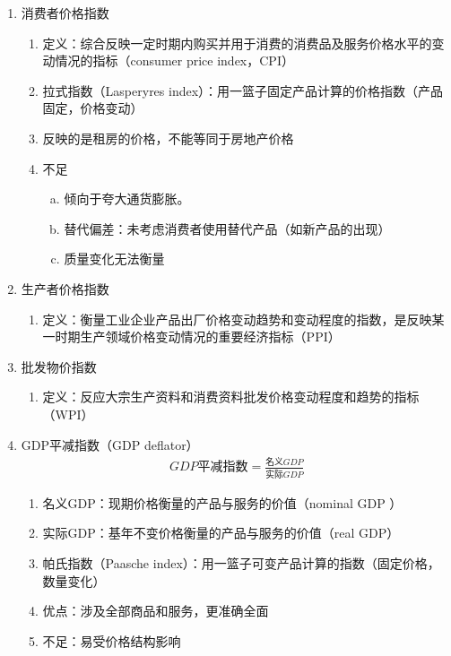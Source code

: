 \documentclass[12pt]{book}
\begin{document}
\begin{enumerate}[1.]
  \item 消费者价格指数
        \begin{enumerate}[(1)]
          \item 定义：综合反映一定时期内购买并用于消费的消费品及服务价格水平的变动情况的指标（consumer price index，CPI）
          \item 拉式指数（Lasperyres index）：用一篮子固定产品计算的价格指数（产品固定，价格变动）
          \item 反映的是租房的价格，不能等同于房地产价格
          \item 不足
                \begin{enumerate}[a.]
                  \item 倾向于夸大通货膨胀。
                  \item 替代偏差：未考虑消费者使用替代产品（如新产品的出现）
                  \item 质量变化无法衡量
                \end{enumerate}
        \end{enumerate}
  \item 生产者价格指数
        \begin{enumerate}[(1)]
          \item 定义：衡量工业企业产品出厂价格变动趋势和变动程度的指数，是反映某一时期生产领域价格变动情况的重要经济指标（PPI）
        \end{enumerate}
  \item 批发物价指数
        \begin{enumerate}[(1)]
          \item 定义：反应大宗生产资料和消费资料批发价格变动程度和趋势的指标（WPI）
        \end{enumerate}
  \item GDP平减指数（GDP deflator）
        \begin{gather*}
          GDP\text{平减指数}=\frac{\text{名义}GDP}{\text{实际}GDP}
        \end{gather*}
        \begin{enumerate}[(1)]
          \item 名义GDP：现期价格衡量的产品与服务的价值（nominal GDP ）
          \item 实际GDP：基年不变价格衡量的产品与服务的价值（real GDP）
          \item 帕氏指数（Paasche index）：用一篮子可变产品计算的指数（固定价格，数量变化）
          \item 优点：涉及全部商品和服务，更准确全面
          \item 不足：易受价格结构影响
        \end{enumerate}
\end{enumerate}
\end{document}
